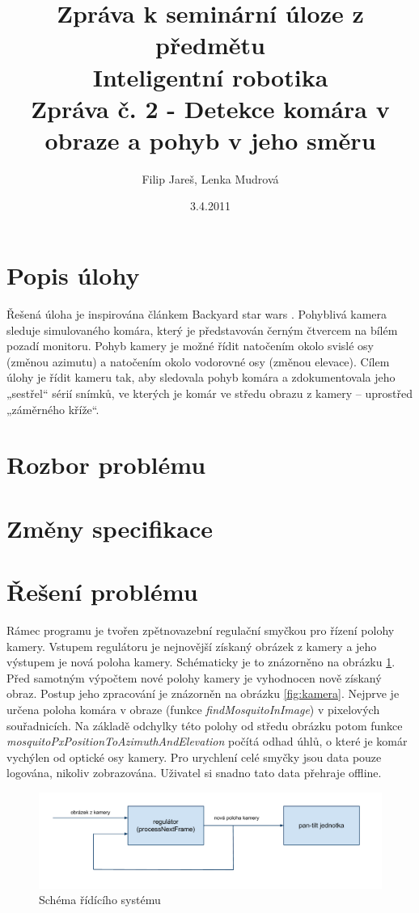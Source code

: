 \documentclass[a4paper,10pt]{article}
\title{Zpráva k seminární úloze z předmětu\\ Inteligentní robotika \\ {\small Zpráva č. 2 - Detekce komára v obraze a pohyb v jeho směru}}
\author{Filip Jareš, Lenka Mudrová}
\date{3.4.2011}
\begin{document}
\maketitle
\newpage


\section{Popis úlohy}

Řešená úloha je inspirována článkem Backyard star wars \cite{clanek}. Pohyblivá kamera sleduje simulovaného komára, který je představován černým čtvercem na bílém pozadí monitoru. Pohyb kamery je možné řídit natočením okolo svislé osy (změnou azimutu) a natočením okolo vodorovné osy (změnou elevace). Cílem úlohy je řídit kameru tak, aby sledovala pohyb komára a zdokumentovala jeho „sestřel“ sérií snímků, ve kterých je komár ve středu obrazu z kamery – uprostřed „záměrného kříže“.

\section{Rozbor problému}

\section{Změny specifikace}

\section{Řešení problému}

Rámec programu je tvořen zpětnovazební regulační smyčkou pro řízení polohy kamery. Vstupem regulátoru je nejnovější získaný obrázek z kamery a jeho výstupem je nová poloha kamery. Schématicky je to znázorněno na obrázku \ref{fig:rid_system}.
Před samotným výpočtem nové polohy kamery je vyhodnocen nově získaný obraz. Postup jeho zpracování je znázorněn na obrázku \ref{fig:kamera}.
Nejprve je určena poloha komára v obraze (funkce \textit{findMosquitoInImage}) v pixelových souřadnicích. Na základě odchylky této polohy od středu obrázku potom funkce \textit{mosquitoPxPositionToAzimuthAndElevation} počítá odhad úhlů, o které je komár vychýlen od optické osy kamery. Pro urychlení celé smyčky jsou data pouze logována, nikoliv zobrazována. Uživatel si snadno tato data přehraje offline.

\begin{figure}[!h]
    \centering
     \includegraphics[width=1\columnwidth]{pics/schema_ridiciho_systemu}
     \caption{Schéma řídícího systému\label{fig:rid_system}}
\end{figure}
\end{document}
